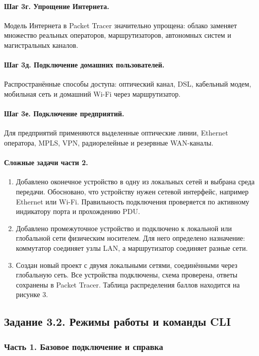 \documentclass[a4paper,14pt,oneside]{extarticle}
\begin{document}
\paragraph{Шаг 3г. Упрощение Интернета.}
Модель Интернета в Packet Tracer значительно упрощена: облако заменяет
множество реальных операторов, маршрутизаторов, автономных систем и
магистральных каналов.

\paragraph{Шаг 3д. Подключение домашних пользователей.}
Распространённые способы доступа: оптический канал, DSL, кабельный
модем, мобильная сеть и домашний Wi-Fi через маршрутизатор.

\paragraph{Шаг 3е. Подключение предприятий.}
Для предприятий применяются выделенные оптические линии, Ethernet
оператора, MPLS, VPN, радиорелейные и резервные WAN-каналы.

\paragraph{Сложные задачи части 2.}
\begin{enumerate}[label=\arabic*.]
\item Добавлено оконечное устройство в одну из локальных сетей и выбрана
среда передачи. Обосновано, что устройству нужен сетевой интерфейс,
например Ethernet или Wi-Fi. Правильность подключения проверяется по
активному индикатору порта и прохождению PDU.
\item Добавлено промежуточное устройство и подключено к локальной или
глобальной сети физическим носителем. Для него определено назначение:
коммутатор соединяет узлы LAN, а маршрутизатор соединяет разные сети.
\item Создан новый проект с двумя локальными сетями, соединёнными через
глобальную сеть. Все устройства подключены, схема проверена, ответы
сохранены в Packet Tracer. Таблица распределения баллов находится на
рисунке 3.
\end{enumerate}

\subsection{Задание 3.2. Режимы работы и команды CLI}

\subsubsection{Часть 1. Базовое подключение и справка}
\end{document}
